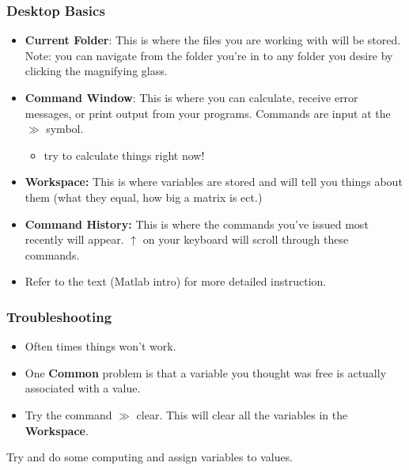 \documentclass{beamer}
\newcommand{\B}{\textbf}
\begin{document}
\begin{frame}
\frametitle{Desktop Basics} 
\begin{itemize}
\item \B{Current Folder}: This is where the files you are working with will be stored. Note: you can navigate from the folder you're in to any folder you desire by clicking the magnifying glass. 
\item \B{Command Window}: This is where you can calculate, receive error messages, or print output from your programs. Commands are input at the $\gg$ symbol. 
\begin{itemize}
\item try to calculate things right now! 
\end{itemize}
\item \B{Workspace:} This is where variables are stored and will tell you things about them (what they equal, how big a matrix is ect.)
\item \B{Command History:} This is where the commands you've issued most recently will appear. $\uparrow$ on your keyboard will scroll through these commands. 
\item Refer to the text (Matlab intro) for more detailed instruction.
\end{itemize}

\end{frame}


\begin{frame}
\frametitle{Troubleshooting} 

\begin{itemize}
\item Often times things won't work. 
\item One \B{Common} problem is that a variable you thought was free is actually associated with a value. 
\item Try the command $\gg$ clear. This will clear all the variables in the \B{Workspace}. 
\end{itemize}

\LARGE 
Try and do some computing and assign variables to values. 

\end{frame}

\end{document}
